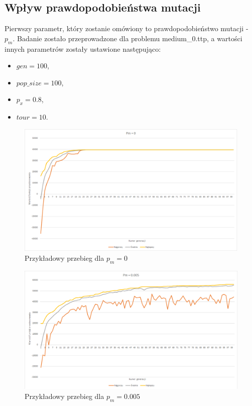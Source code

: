 \documentclass{article}
\begin{document}
	\subsection{Wpływ prawdopodobieństwa mutacji}
	Pierwszy parametr, który zostanie omówiony to prawdopodobieństwo mutacji - $p_m$. Badanie zostało przeprowadzone dla problemu medium\_0.ttp, a wartości innych parametrów zostały ustawione następująco:
	\begin{itemize}
		\item $gen = 100$,
		\item $pop\_size = 100$,
		\item $p_x = 0.8$,
		\item $tour = 10$.
	\end{itemize}

	\begin{figure}[H]
		\centering
		\includegraphics[width=1\linewidth]{pm0.png}
		\caption{Przykładowy przebieg dla $p_m=0$}
		\label{fig:pm0}
	\end{figure}
	
	
	\begin{figure}[H]
		\centering
		\includegraphics[width=1\linewidth]{pm0005.png}
		\caption{Przykładowy przebieg dla $p_m=0.005$}
		\label{fig:pm0005}
	\end{figure}
\end{document}
